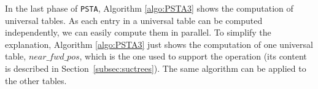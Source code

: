 In the last phase of {\tt PSTA}, Algorithm \ref{algo:PSTA3} shows the computation of
universal tables.
As each entry in a universal table can be computed independently, we can easily compute them in parallel. 
To simplify the explanation, Algorithm
\ref{algo:PSTA3} just shows the computation of one universal table,
$near\_fwd\_pos$, which is the one used to support the {\fwdsearch} operation (its content is described in Section~\ref{subsec:suctrees}). The same algorithm can be applied to the other
tables.
%
%
%
%
%
%
%
